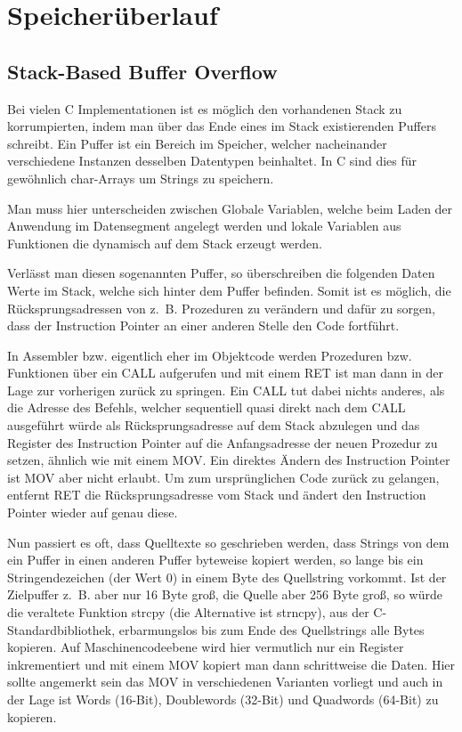 \documentclass[12pt]{book}
\begin{document}
\chapter{Speicherüberlauf}

\section{Stack-Based Buffer Overflow}

Bei vielen C Implementationen ist es möglich den vorhandenen Stack zu
korrumpierten, indem man über das Ende eines im Stack existierenden Puffers
schreibt. Ein Puffer ist ein Bereich im Speicher, welcher nacheinander
verschiedene Instanzen desselben Datentypen beinhaltet. In C sind dies für
gewöhnlich char-Arrays um Strings zu speichern.

Man muss hier unterscheiden zwischen Globale Variablen, welche beim Laden der
Anwendung im Datensegment angelegt werden und lokale Variablen aus Funktionen
die dynamisch auf dem Stack erzeugt werden.

Verlässt man diesen sogenannten Puffer, so überschreiben die folgenden Daten
Werte im Stack, welche sich hinter dem Puffer befinden. Somit ist es möglich,
die Rücksprungsadressen von z. B. Prozeduren zu verändern und dafür zu sorgen,
dass der Instruction Pointer an einer anderen Stelle den Code fortführt.

In Assembler bzw. eigentlich eher im Objektcode werden Prozeduren bzw.
Funktionen über ein CALL aufgerufen und mit einem RET ist man dann in der Lage
zur vorherigen zurück zu springen. Ein CALL tut dabei nichts anderes, als die
Adresse des Befehls, welcher sequentiell quasi direkt nach dem CALL ausgeführt
würde als Rücksprungsadresse auf dem Stack abzulegen und das Register des
Instruction Pointer auf die Anfangsadresse der neuen Prozedur zu setzen, ähnlich
wie mit einem MOV. Ein direktes Ändern des Instruction Pointer ist MOV aber
nicht erlaubt. Um zum ursprünglichen Code zurück zu gelangen, entfernt RET die
Rücksprungsadresse vom Stack und ändert den Instruction Pointer wieder auf genau
diese.

Nun passiert es oft, dass Quelltexte so geschrieben werden, dass Strings von dem
ein Puffer in einen anderen Puffer byteweise kopiert werden, so lange bis ein
Stringendezeichen (der Wert 0) in einem Byte des Quellstring vorkommt. Ist der
Zielpuffer z. B. aber nur 16 Byte groß, die Quelle aber 256 Byte groß, so würde
die veraltete Funktion strcpy (die Alternative ist strncpy), aus der
C-Standardbibliothek, erbarmungslos bis zum Ende des Quellstrings alle Bytes
kopieren. Auf Maschinencodeebene wird hier vermutlich nur ein Register
inkrementiert und mit einem MOV kopiert man dann schrittweise die Daten. Hier
sollte angemerkt sein das MOV in verschiedenen Varianten vorliegt und auch in
der Lage ist Words (16-Bit), Doublewords (32-Bit) und Quadwords (64-Bit) zu
kopieren.
\end{document}
